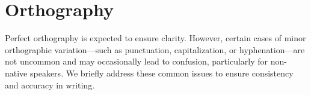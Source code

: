 \chapter{Orthography}
\label{ch:orthography}

Perfect orthography is expected to ensure clarity. 
However, certain cases of minor orthographic variation---such as punctuation, capitalization, or hyphenation---are not uncommon and may occasionally lead to confusion, particularly for non-native speakers.
We briefly address these common issues to ensure consistency and accuracy in writing.






